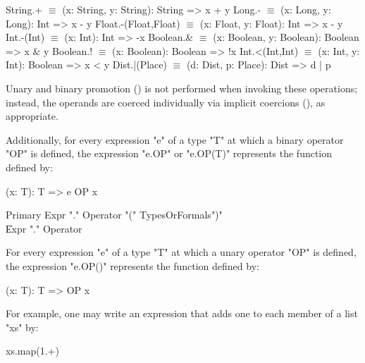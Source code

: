 \begin{xtenmath}
String.+             $\equiv$ (x: String, y: String): String => x + y
Long.-               $\equiv$ (x: Long, y: Long): Int => x - y
Float.-(Float,Float) $\equiv$ (x: Float, y: Float): Int => x - y
Int.-(Int)           $\equiv$ (x: Int): Int => -x
Boolean.&            $\equiv$ (x: Boolean, y: Boolean): Boolean => x & y
Boolean.!            $\equiv$ (x: Boolean): Boolean => !x
Int.<(Int,Int)       $\equiv$ (x: Int, y: Int): Boolean => x < y
Dist.|(Place)        $\equiv$ (d: Dist, p: Place): Dist => d | p
\end{xtenmath}

Unary and binary promotion () is not performed
when invoking these
operations; instead, the operands are coerced individually via implicit
coercions (), as appropriate.

Additionally, for every expression \xcd"e" of a type \xcd"T" at which a binary
operator \xcd"OP" is defined, the expression \xcd"e.OP" or
\xcd"e.OP(T)" represents the function
defined by:

\begin{xten}
(x: T): T => { e OP x }
\end{xten}

\begin{grammar}
Primary \: Expr \xcd"." Operator \xcd"(" TypesOrFormals\opt \xcd")" \\
        \| Expr \xcd"." Operator \\
\end{grammar}

For every expression \xcd"e" of a type \xcd"T" at which a unary
operator \xcd"OP" is defined, the expression \xcd"e.OP()" represents the function
defined by:

\begin{xten}
(x: T): T => { OP x }
\end{xten}


For example,
one may write an expression that adds one to each member of a list \xcd"xs" by:

\begin{xten}
xs.map(1.+)
\end{xten}



